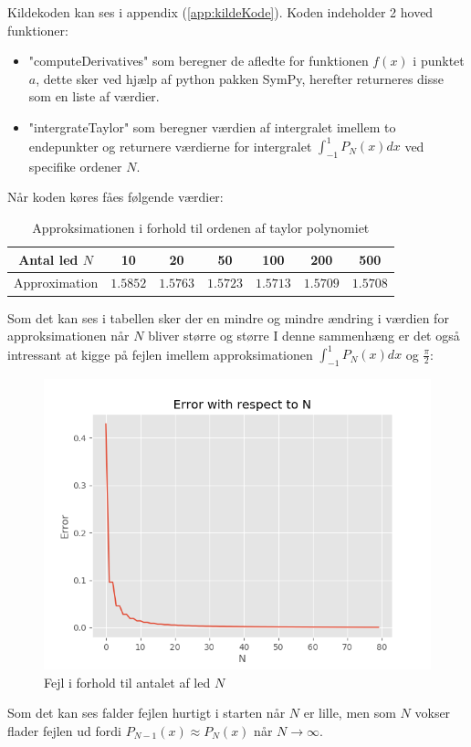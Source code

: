 Kildekoden kan ses i appendix (\ref{app:kildeKode}). 
Koden indeholder 2 hoved funktioner:
\begin{itemize}
  \item "computeDerivatives" som beregner de afledte for funktionen $f(x)$ 
  i punktet $a$, dette sker ved hjælp af python pakken SymPy, herefter returneres disse som en liste af værdier.  
  \item "intergrateTaylor" som beregner værdien af intergralet imellem to endepunkter
  og returnere værdierne for intergralet $\int_{-1}^1 P_N (x) dx$ ved specifike ordener $N$. 
\end{itemize}
Når koden køres fåes følgende værdier:
\begin{table}[H]
  \begin{center}
    \begin{tabular}{ |c|c|c|c|c|c|c| }
      \hline
        Antal led $N$ & 10 & 20 & 50 & 100 & 200 & 500 \\
      \hline
        Approximation & $1.5852$ & $1.5763$ & $1.5723$ & $1.5713$ & $1.5709$ & $1.5708$ \\
      \hline
    \end{tabular}
    \caption{Approksimationen i forhold til ordenen af taylor polynomiet}
  \end{center}
\end{table}
Som det kan ses i tabellen sker der en mindre og mindre ændring i værdien for approksimationen når $N$ bliver større og større
I denne sammenhæng er det også intressant at kigge på fejlen imellem approksimationen $\int_{-1}^1 P_N(x) dx$ og $\frac{\pi}{2}$:
\begin{figure}[H]
  \centering
  \includegraphics[width=\textwidth]{fig/img/ErrorWithRespectToN.png}
  \caption{Fejl i forhold til antalet af led $N$}
  \label{fig:FejlIForholdTilN}
\end{figure}
Som det kan ses falder fejlen hurtigt i starten når $N$ er lille, men som $N$ vokser flader fejlen ud fordi $P_{N-1}(x) \approx P_{N}(x)$ når $N \rightarrow \infty$.